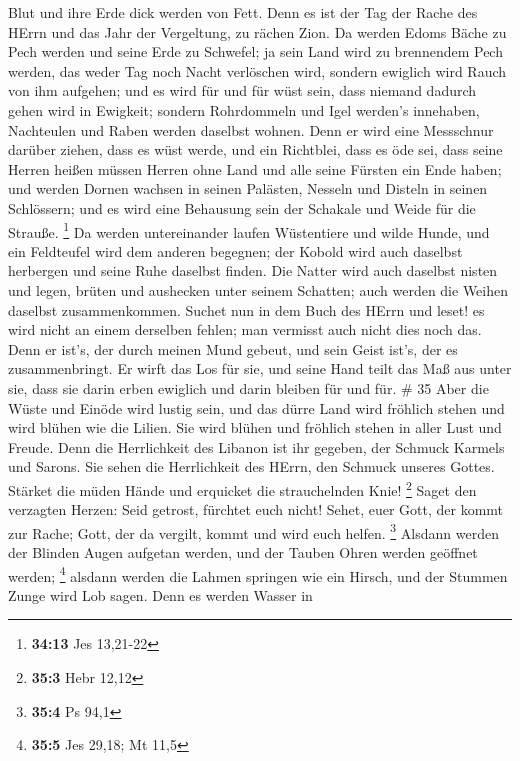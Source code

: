 Blut und ihre Erde dick werden von Fett.  Denn es ist der
Tag der Rache des HErrn und das Jahr der Vergeltung, zu rächen Zion.
 Da werden Edoms Bäche zu Pech werden und seine Erde zu
Schwefel; ja sein Land wird zu brennendem Pech werden,  das
weder Tag noch Nacht verlöschen wird, sondern ewiglich wird Rauch von
ihm aufgehen; und es wird für und für wüst sein, dass niemand dadurch
gehen wird in Ewigkeit;  sondern Rohrdommeln und Igel
werden's innehaben, Nachteulen und Raben werden daselbst wohnen. Denn er
wird eine Messschnur darüber ziehen, dass es wüst werde, und ein
Richtblei, dass es öde sei,  dass seine Herren heißen
müssen Herren ohne Land und alle seine Fürsten ein Ende haben;
 und werden Dornen wachsen in seinen Palästen, Nesseln und
Disteln in seinen Schlössern; und es wird eine Behausung sein der
Schakale und Weide für die Strauße. \footnote{\textbf{34:13} Jes
  13,21-22}  Da werden untereinander laufen Wüstentiere und
wilde Hunde, und ein Feldteufel wird dem anderen begegnen; der Kobold
wird auch daselbst herbergen und seine Ruhe daselbst finden.
 Die Natter wird auch daselbst nisten und legen, brüten und
aushecken unter seinem Schatten; auch werden die Weihen daselbst
zusammenkommen.  Suchet nun in dem Buch des HErrn und
leset! es wird nicht an einem derselben fehlen; man vermisst auch nicht
dies noch das. Denn er ist's, der durch meinen Mund gebeut, und sein
Geist ist's, der es zusammenbringt.  Er wirft das Los für
sie, und seine Hand teilt das Maß aus unter sie, dass sie darin erben
ewiglich und darin bleiben für und für. \# 35  Aber die
Wüste und Einöde wird lustig sein, und das dürre Land wird fröhlich
stehen und wird blühen wie die Lilien.  Sie wird blühen und
fröhlich stehen in aller Lust und Freude. Denn die Herrlichkeit des
Libanon ist ihr gegeben, der Schmuck Karmels und Sarons. Sie sehen die
Herrlichkeit des HErrn, den Schmuck unseres Gottes.  Stärket
die müden Hände und erquicket die strauchelnden Knie! \footnote{\textbf{35:3}
  Hebr 12,12}  Saget den verzagten Herzen: Seid getrost,
fürchtet euch nicht! Sehet, euer Gott, der kommt zur Rache; Gott, der da
vergilt, kommt und wird euch helfen. \footnote{\textbf{35:4} Ps 94,1}
 Alsdann werden der Blinden Augen aufgetan werden, und der
Tauben Ohren werden geöffnet werden; \footnote{\textbf{35:5} Jes 29,18;
  Mt 11,5}  alsdann werden die Lahmen springen wie ein
Hirsch, und der Stummen Zunge wird Lob sagen. Denn es werden Wasser in

